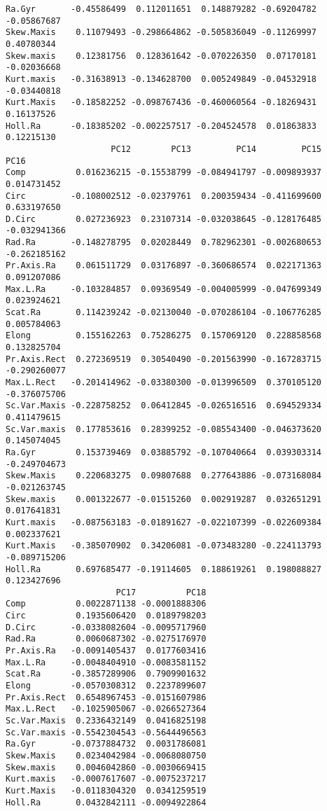 \documentclass[11pt]{article}
\begin{document}
\begin{lstlisting}
Ra.Gyr       -0.45586499  0.112011651  0.148879282 -0.69204782 -0.05867687
Skew.Maxis    0.11079493 -0.298664862 -0.505836049 -0.11269997  0.40780344
Skew.maxis    0.12381756  0.128361642 -0.070226350  0.07170181 -0.02036668
Kurt.maxis   -0.31638913 -0.134628700  0.005249849 -0.04532918 -0.03440818
Kurt.Maxis   -0.18582252 -0.098767436 -0.460060564 -0.18269431  0.16137526
Holl.Ra      -0.18385202 -0.002257517 -0.204524578  0.01863833  0.12215130
                     PC12        PC13         PC14         PC15         PC16
Comp          0.016236215 -0.15538799 -0.084941797 -0.009893937  0.014731452
Circ         -0.108002512 -0.02379761  0.200359434 -0.411699600  0.633197650
D.Circ        0.027236923  0.23107314 -0.032038645 -0.128176485 -0.032941366
Rad.Ra       -0.148278795  0.02028449  0.782962301 -0.002680653 -0.262185162
Pr.Axis.Ra    0.061511729  0.03176897 -0.360686574  0.022171363  0.091207086
Max.L.Ra     -0.103284857  0.09369549 -0.004005999 -0.047699349  0.023924621
Scat.Ra       0.114239242 -0.02130040 -0.070286104 -0.106776285  0.005784063
Elong         0.155162263  0.75286275  0.157069120  0.228858568  0.132825704
Pr.Axis.Rect  0.272369519  0.30540490 -0.201563990 -0.167283715 -0.290260077
Max.L.Rect   -0.201414962 -0.03380300 -0.013996509  0.370105120 -0.376075706
Sc.Var.Maxis -0.228758252  0.06412845 -0.026516516  0.694529334  0.411479615
Sc.Var.maxis  0.177853616  0.28399252 -0.085543400 -0.046373620  0.145074045
Ra.Gyr        0.153739469  0.03885792 -0.107040664  0.039303314 -0.249704673
Skew.Maxis    0.220683275  0.09807688  0.277643886 -0.073168084 -0.021263745
Skew.maxis    0.001322677 -0.01515260  0.002919287  0.032651291  0.017641831
Kurt.maxis   -0.087563183 -0.01891627 -0.022107399 -0.022609384  0.002337621
Kurt.Maxis   -0.385070902  0.34206081 -0.073483280 -0.224113793 -0.089715206
Holl.Ra       0.697685477 -0.19114605  0.188619261  0.198088827  0.123427696
                      PC17          PC18
Comp          0.0022871138 -0.0001888306
Circ          0.1935606420  0.0189798203
D.Circ       -0.0338082604 -0.0095717960
Rad.Ra        0.0060687302 -0.0275176970
Pr.Axis.Ra   -0.0091405437  0.0177603416
Max.L.Ra     -0.0048404910 -0.0083581152
Scat.Ra      -0.3857289906  0.7909901632
Elong        -0.0570308312  0.2237899607
Pr.Axis.Rect  0.6548967453 -0.0151607986
Max.L.Rect   -0.1025905067 -0.0266527364
Sc.Var.Maxis  0.2336432149  0.0416825198
Sc.Var.maxis -0.5542304543 -0.5644496563
Ra.Gyr       -0.0737884732  0.0031786081
Skew.Maxis    0.0234042984 -0.0068080750
Skew.maxis    0.0046042860 -0.0030669415
Kurt.maxis   -0.0007617607 -0.0075237217
Kurt.Maxis   -0.0118304320  0.0341259519
Holl.Ra       0.0432842111 -0.0094922864



\end{lstlisting}
\end{document}
